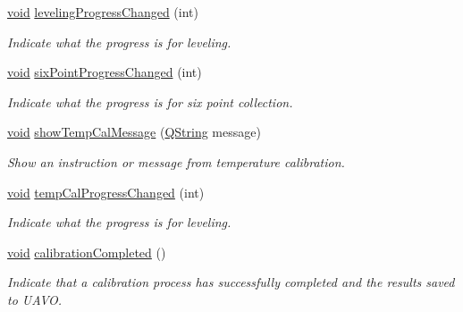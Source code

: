 \begin{DoxyCompactItemize}
\hyperlink{group___u_a_v_objects_plugin_ga444cf2ff3f0ecbe028adce838d373f5c}{void} \hyperlink{class_calibration_a34770d5a2df9d4dd5e5845c8c0633a63}{leveling\-Progress\-Changed} (int)
\begin{DoxyCompactList}\small\item\em \-Indicate what the progress is for leveling. \end{DoxyCompactList}\item 
\hyperlink{group___u_a_v_objects_plugin_ga444cf2ff3f0ecbe028adce838d373f5c}{void} \hyperlink{class_calibration_a147fed7878b2ce2578f912e377447cc8}{six\-Point\-Progress\-Changed} (int)
\begin{DoxyCompactList}\small\item\em \-Indicate what the progress is for six point collection. \end{DoxyCompactList}\item 
\hyperlink{group___u_a_v_objects_plugin_ga444cf2ff3f0ecbe028adce838d373f5c}{void} \hyperlink{class_calibration_a6d1fe12509a4d29e08cb8d76e7d81b20}{show\-Temp\-Cal\-Message} (\hyperlink{group___u_a_v_objects_plugin_gab9d252f49c333c94a72f97ce3105a32d}{\-Q\-String} message)
\begin{DoxyCompactList}\small\item\em \-Show an instruction or message from temperature calibration. \end{DoxyCompactList}\item 
\hyperlink{group___u_a_v_objects_plugin_ga444cf2ff3f0ecbe028adce838d373f5c}{void} \hyperlink{class_calibration_a7d28d53212a12e83b021eb3d32e06bcd}{temp\-Cal\-Progress\-Changed} (int)
\begin{DoxyCompactList}\small\item\em \-Indicate what the progress is for leveling. \end{DoxyCompactList}\item 
\hyperlink{group___u_a_v_objects_plugin_ga444cf2ff3f0ecbe028adce838d373f5c}{void} \hyperlink{class_calibration_a4e681ad78dc398b52b137dad1fe8e18b}{calibration\-Completed} ()
\begin{DoxyCompactList}\small\item\em \-Indicate that a calibration process has successfully completed and the results saved to \-U\-A\-V\-O. \end{DoxyCompactList}\end{DoxyCompactItemize}
